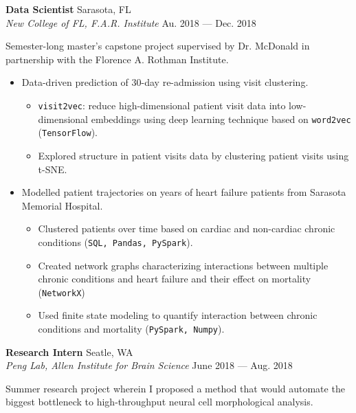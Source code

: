 \documentclass[a4paper,12pt]{article}
\newcommand{\ressubheading}[4]{{\begin{minipage}{\textwidth}
                                    \textbf{#1} \hfill #2 \\
                                    \textit{#3} \hfill #4 \\
\end{minipage}}}
\begin{document}
    \ressubheading{Data Scientist}{Sarasota, FL}{New College of FL, F.A.R. Institute}{Au. 2018 --- Dec. 2018}

    \vspace{-6pt} Semester-long master's capstone project supervised by Dr. McDonald in partnership with the Florence A. Rothman Institute.


    \begin{itemize}
        \item Data-driven prediction of 30-day re-admission using visit clustering.

        \begin{itemize}
            \item \texttt{visit2vec}: reduce high-dimensional patient visit data into low-dimensional embeddings using deep learning technique based on \texttt{word2vec} (\texttt{TensorFlow}).
            \item Explored structure in patient visits data by clustering patient visits using t-SNE\@.
        \end{itemize}



        \item Modelled patient trajectories on years of heart failure patients from Sarasota Memorial Hospital.
        \begin{itemize}
            \item Clustered patients over time based on cardiac and non-cardiac chronic conditions (\texttt{SQL, Pandas, PySpark}).
            \item Created network graphs characterizing interactions between multiple chronic conditions and heart failure and their effect on mortality (\texttt{NetworkX})
            \item Used finite state modeling to quantify interaction between chronic conditions and mortality (\texttt{PySpark, Numpy}).
        \end{itemize}

    \end{itemize}

    \ressubheading{Research Intern}{Seatle, WA}{Peng Lab, Allen Institute for Brain Science}{June 2018 --- Aug. 2018}

    \vspace{-6pt} Summer research project wherein I proposed a method that would automate the biggest bottleneck to high-throughput neural cell morphological analysis.
\end{document}
